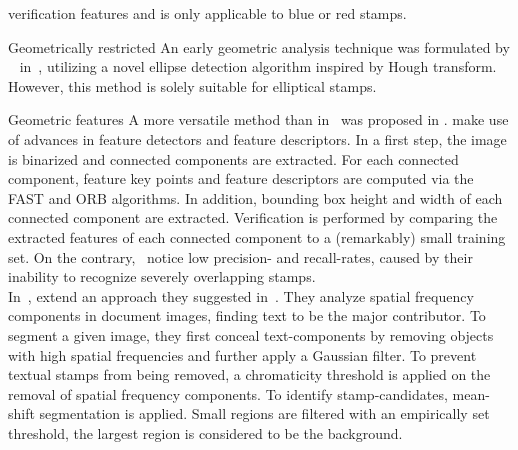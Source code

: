 \begin{description}
\begin{enumerate*}[label={\alph*)},font={\color{red!50!black}\bfseries}]
                    verification features and is only applicable to blue or red
                    stamps.\\
                \item [Geometrically restricted]
                    An early geometric analysis technique was formulated by
                    ~\citeauthor*{Zhu.2006} in~\cite{Zhu.2006}, utilizing a
                    novel ellipse detection algorithm inspired by Hough
                    transform. However, this method is solely suitable for
                    elliptical stamps.
        \end{enumerate*}
    \item [Generic approaches]
    \begin{enumerate*}[label={\alph*)},font={\color{red!50!black}\bfseries}]
        \item [Geometric features]
        A more versatile method than in~\cite{Zhu.2006} was proposed in
        \cite{Ahmed.25.08.201328.08.2013, Ahmed.2016}.
        \citeauthor*{Ahmed.25.08.201328.08.2013} make use of advances in
        feature detectors and feature descriptors. In a first step, the
        image is binarized and connected components are extracted. For each
        connected component, feature key points and feature descriptors are
        computed via the FAST and ORB algorithms. In addition, bounding box
        height and width of each connected component are extracted.
        Verification is performed by comparing the extracted features of each
        connected component to a (remarkably) small training set. On the
        contrary,~\citeauthor*{Ahmed.25.08.201328.08.2013} notice low precision-
        and recall-rates, caused by their inability to recognize severely
        overlapping stamps.\\
        In~\cite{Nandedkar.16.12.201519.12.2015},
        \citeauthor*{Nandedkar.16.12.201519.12.2015} extend an approach they
        suggested in~\cite{Nandedkar.23.08.201526.08.2015}. They analyze spatial
        frequency components in document images, finding text to be the major
        contributor. To segment a given image, they first conceal
        text-components by removing objects with high spatial frequencies and
        further apply a Gaussian filter. To prevent textual stamps from being
        removed, a chromaticity threshold is applied on the removal of spatial
        frequency components. To identify stamp-candidates, mean-shift
        segmentation is applied. Small regions are filtered with an empirically
        set threshold, the largest region is considered to be the background.

\end{enumerate*}
\end{description}
